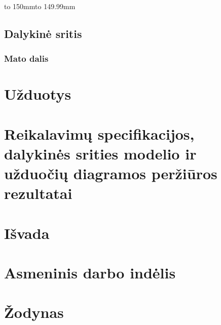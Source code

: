 \documentclass[oneside]{VUMIFPSkursinis}
\begin{document}
\hbox to 150mm{\hbox to 149.99mm{}}

\subsection{Dalykinė sritis}
	\subsubsection{Mato dalis}
	


\section{Užduotys}

\section{Reikalavimų specifikacijos, dalykinės srities modelio ir užduočių diagramos peržiūros rezultatai}

\section{Išvada}

\section{Asmeninis darbo indėlis}

\section{Žodynas}
\end{document}
